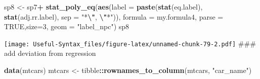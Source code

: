 \documentclass[
]{article}
\newenvironment{Shaded}{\begin{snugshade}}{\end{snugshade}}
\newcommand{\AttributeTok}[1]{\textcolor[rgb]{0.13,0.29,0.53}{#1}}
\newcommand{\ConstantTok}[1]{\textcolor[rgb]{0.56,0.35,0.01}{#1}}
\newcommand{\DecValTok}[1]{\textcolor[rgb]{0.00,0.00,0.81}{#1}}
\newcommand{\FunctionTok}[1]{\textcolor[rgb]{0.13,0.29,0.53}{\textbf{#1}}}
\newcommand{\NormalTok}[1]{#1}
\newcommand{\OtherTok}[1]{\textcolor[rgb]{0.56,0.35,0.01}{#1}}
\newcommand{\SpecialCharTok}[1]{\textcolor[rgb]{0.81,0.36,0.00}{\textbf{#1}}}
\newcommand{\StringTok}[1]{\textcolor[rgb]{0.31,0.60,0.02}{#1}}
\begin{document}
\begin{Shaded}
\begin{Highlighting}[]
\NormalTok{sp8 }\OtherTok{\textless{}{-}}\NormalTok{ sp7}\SpecialCharTok{+}
  \FunctionTok{stat\_poly\_eq}\NormalTok{(}\FunctionTok{aes}\NormalTok{(}\AttributeTok{label =}  \FunctionTok{paste}\NormalTok{(}\FunctionTok{stat}\NormalTok{(eq.label),}
                                  \FunctionTok{stat}\NormalTok{(adj.rr.label), }\AttributeTok{sep =} \StringTok{"*}\SpecialCharTok{\textbackslash{}"}\StringTok{, }\SpecialCharTok{\textbackslash{}"}\StringTok{*"}\NormalTok{)),}
               \AttributeTok{formula =}\NormalTok{ my.formula4, }\AttributeTok{parse =} \ConstantTok{TRUE}\NormalTok{,}\AttributeTok{size=}\DecValTok{3}\NormalTok{,  }\AttributeTok{geom =} \StringTok{"label\_npc"}\NormalTok{)}
\NormalTok{sp8}
\end{Highlighting}
\end{Shaded}

\texttt{[image: Useful-Syntax\_files/figure-latex/unnamed-chunk-79-2.pdf]}
\#\#\# add deviation from regression

\begin{Shaded}
\begin{Highlighting}[]
\FunctionTok{data}\NormalTok{(mtcars)}
\NormalTok{mtcars }\OtherTok{\textless{}{-}}\NormalTok{ tibble}\SpecialCharTok{::}\FunctionTok{rownames\_to\_column}\NormalTok{(mtcars, }\StringTok{"car\_name"}\NormalTok{)}
\end{Highlighting}
\end{Shaded}
\end{document}
